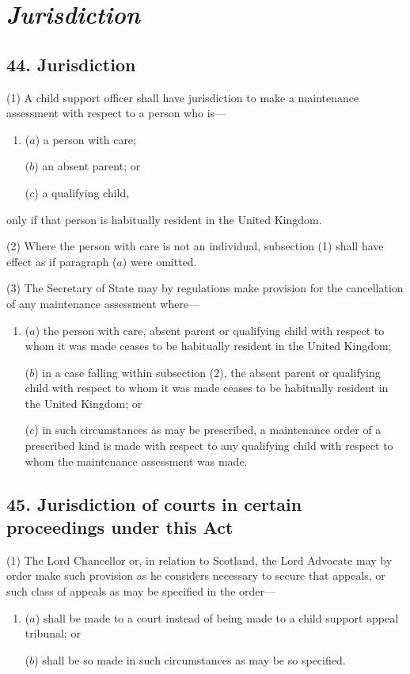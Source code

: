 \documentclass[12pt,a4paper]{article}
\begin{document}
\section{\itshape Jurisdiction}

\subsection{44. Jurisdiction}

(1) A child support officer shall have jurisdiction to make a maintenance assessment with respect to a person who is—
\begin{enumerate}\item[]
($a$) a person with care;

($b$) an absent parent; or

($c$) a qualifying child,
\end{enumerate}
only if that person is habitually resident in the United Kingdom.

(2) Where the person with care is not an individual, subsection (1)  shall have effect as if paragraph ($a$)  were omitted.

(3) The Secretary of State may by regulations make provision for the cancellation of any maintenance assessment where—
\begin{enumerate}\item[]
($a$) the person with care, absent parent or qualifying child with respect to whom it was made ceases to be habitually resident in the United Kingdom;

($b$) in a case falling within subsection (2), the absent parent or qualifying child with respect to whom it was made ceases to be habitually resident in the United Kingdom; or

($c$) in such circumstances as may be prescribed, a maintenance order of a prescribed kind is made with respect to any qualifying child with respect to whom the maintenance assessment was made.
\end{enumerate}


\subsection{45. Jurisdiction of courts in certain proceedings under this Act}

(1) The Lord Chancellor or, in relation to Scotland, the Lord Advocate may by order make such provision as he considers necessary to secure that appeals, or such class of appeals as may be specified in the order—
\begin{enumerate}\item[]
($a$) shall be made to a court instead of being made to a child support appeal tribunal; or

($b$) shall be so made in such circumstances as may be so specified.
\end{enumerate}
\end{document}
